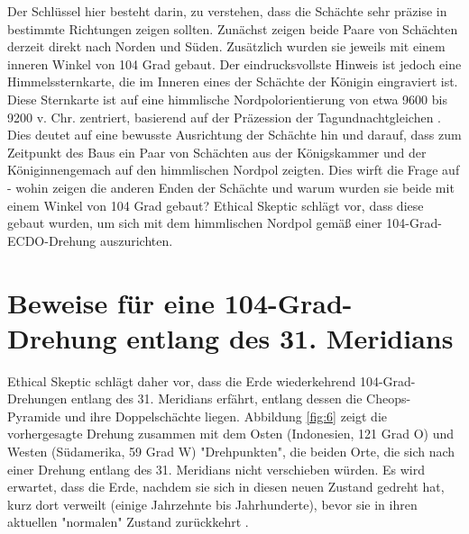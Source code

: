 \documentclass[10pt,twocolumn,letterpaper]{article}
\begin{document}
Der Schlüssel hier besteht darin, zu verstehen, dass die Schächte sehr präzise in bestimmte Richtungen zeigen sollten. Zunächst zeigen beide Paare von Schächten derzeit direkt nach Norden und Süden. Zusätzlich wurden sie jeweils mit einem inneren Winkel von 104 Grad gebaut.
Der eindrucksvollste Hinweis ist jedoch eine Himmelssternkarte, die im Inneren eines der Schächte der Königin eingraviert ist. Diese Sternkarte ist auf eine himmlische Nordpolorientierung von etwa 9600 bis 9200 v. Chr. zentriert, basierend auf der Präzession der Tagundnachtgleichen \cite{28}. Dies deutet auf eine bewusste Ausrichtung der Schächte hin und darauf, dass zum Zeitpunkt des Baus ein Paar von Schächten aus der Königskammer und der Königinnengemach auf den himmlischen Nordpol zeigten. Dies wirft die Frage auf - wohin zeigen die anderen Enden der Schächte und warum wurden sie beide mit einem Winkel von 104 Grad gebaut? Ethical Skeptic schlägt vor, dass diese gebaut wurden, um sich mit dem himmlischen Nordpol gemäß einer 104-Grad-ECDO-Drehung auszurichten.

\section{Beweise für eine 104-Grad-Drehung entlang des 31. Meridians}

Ethical Skeptic schlägt daher vor, dass die Erde wiederkehrend 104-Grad-Drehungen entlang des 31. Meridians erfährt, entlang dessen die Cheops-Pyramide und ihre Doppelschächte liegen. Abbildung \ref{fig:6} zeigt die vorhergesagte Drehung zusammen mit dem Osten (Indonesien, 121 Grad O) und Westen (Südamerika, 59 Grad W) "Drehpunkten", die beiden Orte, die sich nach einer Drehung entlang des 31. Meridians nicht verschieben würden. Es wird erwartet, dass die Erde, nachdem sie sich in diesen neuen Zustand gedreht hat, kurz dort verweilt (einige Jahrzehnte bis Jahrhunderte), bevor sie in ihren aktuellen "normalen" Zustand zurückkehrt \cite{150}.
\end{document}
